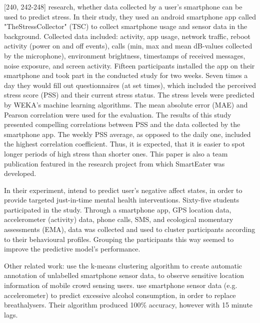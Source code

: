 \textcite{SmartphoneBasedStressPrediction2015}[240, 242-248] research, whether data collected by a user's smartphone can be used to predict stress. In their study, they used an android smartphone app called "TheStressCollector" (TSC) to collect smartphone usage and sensor data in the background. Collected data included: activity, app usage, network traffic, reboot activity (power on and off events), calls (min, max and mean dB-values collected by the microphone), environment brightness, timestamps of received messages, noise exposure, and screen activity. Fifteen participants installed the app on their smartphone and took part in the conducted study for two weeks. Seven times a day they would fill out questionnaires (at set times), which included the perceived stress score (PSS) and their current stress status. The stress levels were predicted by WEKA's machine learning algorithms. The mean absolute error (MAE) and Pearson correlation were used for the evaluation. The results of this study presented compelling correlations between PSS and the data collected by the smartphone app. The weekly PSS average, as opposed to the daily one, included the highest correlation coefficient. Thus, it is expected, that it is easier to spot longer periods of high stress than shorter ones. This paper is also a team publication featured in the research project from which SmartEater was developed.

In their experiment, \textcite{ClusterPassivelySensedData2018} intend to predict user's negative affect states, in order to provide targeted just-in-time mental health interventions. Sixty-five students participated in the study. Through a smartphone app, GPS location data, accelerometer (activity) data, phone calls, SMS, and ecological momentary assessments (EMA), data was collected and used to cluster participants according to their behavioural profiles. Grouping the participants this way seemed to improve the predictive model's performance.

Other related work: 
\textcite{pius2018automatic} use the k-means clustering algorithm to create automatic annotation of unlabelled smartphone sensor data, to observe sensitive location information of mobile crowd sensing users. \textcite{alcoholCravingPrediction} use smartphone sensor data (e.g. accelerometer) to predict excessive alcohol consumption, in order to replace breathalysers. Their algorithm produced 100\% accuracy, however with 15 minute lags.
